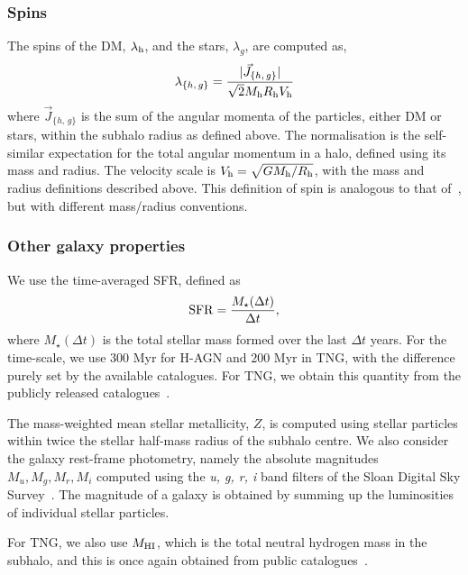 \documentclass[useAMS,usenatbib]{mnras}
\begin{document}
\subsubsection{Spins}

The spins of the \ac{DM}, $\lambda_{\rm h}$, and the stars, $\lambda_g$, are computed as,
\begin{equation}
    \lambda_{\{h,\,g\}} = \frac{|\Vec{J}_{\{h,\,g\}}|}{\sqrt{2}M_{\rm h}R_{\rm h}V_{\rm h}}
\end{equation}
where $\Vec{J}_{\{h,\,g\}}$ is the sum of the angular momenta of the particles, either \ac{DM} or stars, within the subhalo radius as defined above. The normalisation is the self-similar expectation for the total angular momentum in a halo, defined using its mass and radius. The velocity scale is $V_{\rm h} = \sqrt{GM_{\rm h}/R_{\rm h}}$, with the mass and radius definitions described above. This definition of spin is analogous to that of~\citet{Bullock_2001}, but with different mass/radius conventions.

\subsubsection{Other galaxy properties}\label{sec:other_gal_props}

We use the time-averaged SFR, defined as
\begin{equation}
    {\rm SFR} = \frac{M_\star(\Delta t)}{\Delta t},
\end{equation}
where $M_\star(\Delta t)$ is the total stellar mass formed over the last $\Delta t$ years. For the time-scale, we use $300$ Myr for H-AGN and $200$ Myr in TNG, with the difference purely set by the available catalogues. For TNG, we obtain this quantity from the publicly released catalogues~\citep{Donnari_2019, Pillepich_2019}.

The mass-weighted mean stellar metallicity, $Z$, is computed using stellar particles within twice the stellar half-mass radius of the subhalo centre. We also consider the galaxy rest-frame photometry, namely the absolute magnitudes $M_u, M_g, M_r, M_i$ computed using the \textit{u, g, r, i} band filters of the Sloan Digital Sky Survey~\citep{Kaviraj_2017,Laigle_2019}. The magnitude of a galaxy is obtained by summing up the luminosities of individual stellar particles.

For TNG, we also use $M_{\rm HI}$, which is the total neutral hydrogen mass in the subhalo, and this is once again obtained from public catalogues~\citep{Diemer_2018,Diemer_2019}.
\end{document}
